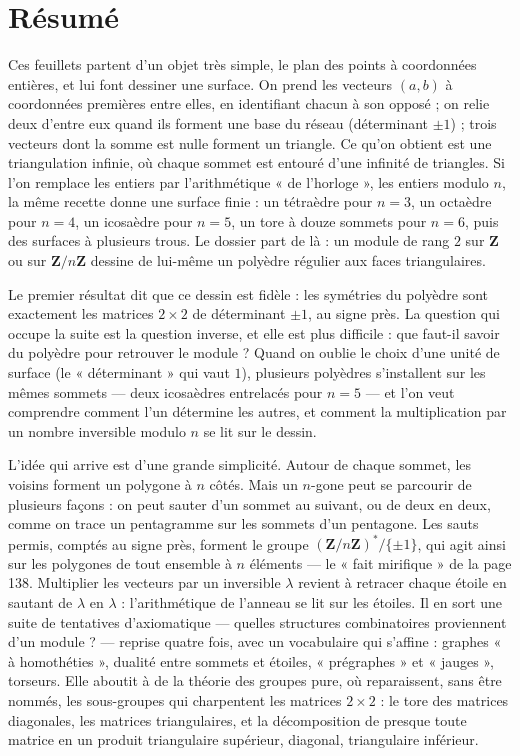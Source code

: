\documentclass[11pt,a4paper]{article}
\begin{document}
\section*{Résumé}

\begin{resume}
Ces feuillets partent d'un objet très simple, le plan des points à
coordonnées entières, et lui font dessiner une surface. On prend les vecteurs
$(a, b)$ à coordonnées premières entre elles, en identifiant chacun à son
opposé ; on relie deux d'entre eux quand ils forment une base du réseau
(déterminant $\pm 1$) ; trois vecteurs dont la somme est nulle forment un
triangle. Ce qu'on obtient est une triangulation infinie, où chaque sommet est
entouré d'une infinité de triangles. Si l'on remplace les entiers par
l'arithmétique « de l'horloge », les entiers modulo $n$, la même recette donne
une surface finie : un tétraèdre pour $n = 3$, un octaèdre pour $n = 4$, un
icosaèdre pour $n = 5$, un tore à douze sommets pour $n = 6$, puis des surfaces
à plusieurs trous. Le dossier part de là : un module de rang $2$ sur
$\mathbf{Z}$ ou sur $\mathbf{Z}/n\mathbf{Z}$ dessine de lui-même un polyèdre
régulier aux faces triangulaires.

Le premier résultat dit que ce dessin est fidèle : les symétries du polyèdre
sont exactement les matrices $2 \times 2$ de déterminant $\pm 1$, au signe près. La
question qui occupe la suite est la question inverse, et elle est plus
difficile : que faut-il savoir du polyèdre pour retrouver le module ? Quand on
oublie le choix d'une unité de surface (le « déterminant » qui vaut $1$),
plusieurs polyèdres s'installent sur les mêmes sommets --- deux icosaèdres
entrelacés pour $n = 5$ --- et l'on veut comprendre comment l'un détermine les
autres, et comment la multiplication par un nombre inversible modulo $n$ se
lit sur le dessin.

L'idée qui arrive est d'une grande simplicité. Autour de chaque sommet, les
voisins forment un polygone à $n$ côtés. Mais un $n$-gone peut se parcourir de
plusieurs façons : on peut sauter d'un sommet au suivant, ou de deux en deux,
comme on trace un pentagramme sur les sommets d'un pentagone. Les sauts
permis, comptés au signe près, forment le groupe $(\mathbf{Z}/n\mathbf{Z})^{*}
/ \{\pm 1\}$, qui agit ainsi sur les polygones de tout ensemble à $n$ éléments
--- le « fait mirifique » de la page 138. Multiplier les vecteurs par un
inversible $\lambda$ revient à retracer chaque étoile en sautant de $\lambda$
en $\lambda$ : l'arithmétique de l'anneau se lit sur les étoiles. Il en sort
une suite de tentatives d'axiomatique --- quelles structures combinatoires
proviennent d'un module ? --- reprise quatre fois, avec un vocabulaire qui
s'affine : graphes « à homothéties », dualité entre sommets et étoiles,
« prégraphes » et « jauges », torseurs. Elle aboutit à de la théorie des
groupes pure, où reparaissent, sans être nommés, les sous-groupes qui
charpentent les matrices $2 \times 2$ : le tore des matrices diagonales, les
matrices triangulaires, et la décomposition de presque toute matrice en un
produit triangulaire supérieur, diagonal, triangulaire inférieur.


\end{resume}
\end{document}
